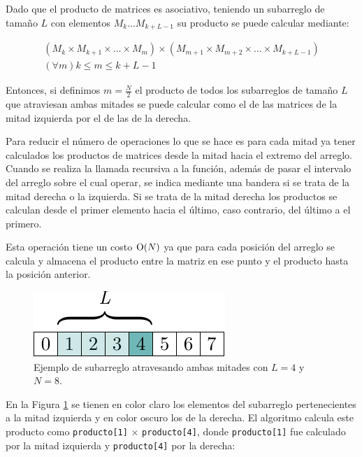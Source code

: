 Dado que el producto de matrices es asociativo, teniendo un subarreglo de tamaño
$L$ con elementos $M_k \dots M_{k + L - 1}$ su producto se puede calcular
mediante:

\begin{gather*}
	\left(M_k \times M_{k + 1} \times \dots \times M_m\right) \times
		\left(M_{m + 1} \times M_{m + 2} \times \dots \times M_{k + L - 1}\right) \\
		\left(\forall m\right) k \leq m \leq k + L - 1
\end{gather*}

Entonces, si definimos $m = \frac{N}{2}$ el producto de todos los subarreglos de
tamaño $L$ que atraviesan ambas mitades se puede calcular como el de las
matrices de la mitad izquierda por el de las de la derecha.

Para reducir el número de operaciones lo que se hace es para cada mitad ya tener
calculados los productos de matrices desde la mitad hacia el extremo del
arreglo. Cuando se realiza la llamada recursiva a la función, además de pasar el
intervalo del arreglo sobre el cual operar, se indica mediante una bandera si se
trata de la mitad derecha o la izquierda. Si se trata de la mitad derecha los
productos se calculan desde el primer elemento hacia el último, caso
contrario, del último a el primero.

Esta operación tiene un costo $\operatorname{O}(N)$ ya que para cada posición del arreglo se
calcula y almacena el producto entre la matriz en ese punto y el producto hasta
la posición anterior.

\begin{figure}[H]
	\centering
	\includegraphics{imagenes/subarray_product_across.pdf}
	\caption{Ejemplo de subarreglo atravesando ambas mitades con $L = 4$ y $N = 8$.}
	\label{ej4:fig:subarray}
\end{figure}

En la Figura \ref{ej4:fig:subarray} se tienen en color claro los elementos del
subarreglo pertenecientes a la mitad izquierda y en color oscuro los de la
derecha. El algoritmo calcula este producto como \texttt{producto[1]} $\times$
\texttt{producto[4]}, donde \texttt{producto[1]} fue calculado por la mitad
izquierda y \texttt{producto[4]} por la derecha:

